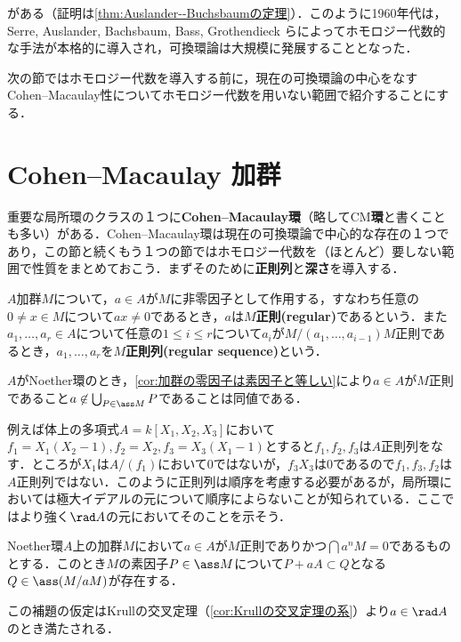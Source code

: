 がある（証明は\ref{thm:Auslander--Buchsbaumの定理}）．このように1960年代は，Serre, Auslander, Bachsbaum, Bass, Grothendieck らによってホモロジー代数的な手法が本格的に導入され，可換環論は大規模に発展することとなった．

次の節ではホモロジー代数を導入する前に，現在の可換環論の中心をなすCohen--Macaulay性についてホモロジー代数を用いない範囲で紹介することにする．

\section{Cohen--Macaulay 加群}

重要な局所環のクラスの１つに\textbf{Cohen--Macaulay環}（略してCM\textbf{環}と書くことも多い）がある．Cohen--Macaulay環は現在の可換環論で中心的な存在の１つであり，この節と続くもう１つの節ではホモロジー代数を（ほとんど）要しない範囲で性質をまとめておこう．まずそのために\textbf{正則列}と\textbf{深さ}を導入する．

\begin{defi}[正則列]
	$A$加群$M$について，$a\in A$が$M$に非零因子として作用する，すなわち任意の$0\neq x\in M$について$ax\neq0$であるとき，$a$は$M$\textbf{正則(regular)}であるという．また$a_1,\dots,a_r\in A$について任意の$1\leq i\leq r$について$a_i$が$M/(a_1,\dots,a_{i-1})M$正則であるとき，$a_1,\dots,a_r$を$M$\textbf{正則列(regular sequence)}という．
\end{defi}

$A$がNoether環のとき，\ref{cor:加群の零因子は素因子と等しい}により$a\in A$が$M$正則であること$a\not\in\bigcup_{P\in\ass M}P$であることは同値である．

例えば体上の多項式$A=k[X_1,X_2,X_3]$において$f_1=X_1(X_2-1),f_2=X_2,f_3=X_3(X_1-1)$とすると$f_1,f_2,f_3$は$A$正則列をなす．ところが$X_1$は$A/(f_1)$において$0$ではないが，$f_3X_3$は$0$であるので$f_1,f_3,f_2$は$A$正則列ではない．このように正則列は順序を考慮する必要があるが，局所環においては極大イデアルの元について順序によらないことが知られている．ここではより強く$\rad A$の元においてそのことを示そう．

\begin{lem}\label{lem:正則元と素因子}
	Noether環$A$上の加群$M$において$a\in A$が$M$正則でありかつ$\bigcap a^nM=0$であるものとする．このとき$M$の素因子$P\in\ass M$について$P+aA\subset Q$となる$Q\in\ass (M/aM)$が存在する．
\end{lem}

この補題の仮定はKrullの交叉定理（\ref{cor:Krullの交叉定理の系}）より$a\in\rad A$のとき満たされる．

